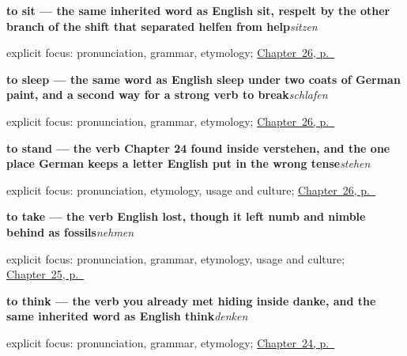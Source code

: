 \noindent\begin{minipage}[t]{\linewidth}
\raggedright
\textbf{to sit — the same inherited word as English sit, respelt by the other branch of the shift that separated helfen from help}\enspace\emph{sitzen}\par
\footnotesize explicit focus: pronunciation, grammar, etymology; \hyperref[ch:ge-still-verbs]{Chapter~26, p.~\pageref*{ch:ge-still-verbs}}
\end{minipage}\par\smallskip

\noindent\begin{minipage}[t]{\linewidth}
\raggedright
\textbf{to sleep — the same word as English sleep under two coats of German paint, and a second way for a strong verb to break}\enspace\emph{schlafen}\par
\footnotesize explicit focus: pronunciation, grammar, etymology; \hyperref[ch:ge-still-verbs]{Chapter~26, p.~\pageref*{ch:ge-still-verbs}}
\end{minipage}\par\smallskip

\noindent\begin{minipage}[t]{\linewidth}
\raggedright
\textbf{to stand — the verb Chapter 24 found inside verstehen, and the one place German keeps a letter English put in the wrong tense}\enspace\emph{stehen}\par
\footnotesize explicit focus: pronunciation, etymology, usage and culture; \hyperref[ch:ge-still-verbs]{Chapter~26, p.~\pageref*{ch:ge-still-verbs}}
\end{minipage}\par\smallskip

\noindent\begin{minipage}[t]{\linewidth}
\raggedright
\textbf{to take — the verb English lost, though it left numb and nimble behind as fossils}\enspace\emph{nehmen}\par
\footnotesize explicit focus: pronunciation, grammar, etymology, usage and culture; \hyperref[ch:ge-doing-verbs]{Chapter~25, p.~\pageref*{ch:ge-doing-verbs}}
\end{minipage}\par\smallskip

\noindent\begin{minipage}[t]{\linewidth}
\raggedright
\textbf{to think — the verb you already met hiding inside danke, and the same inherited word as English think}\enspace\emph{denken}\par
\footnotesize explicit focus: pronunciation, grammar, etymology; \hyperref[ch:ge-mind-verbs]{Chapter~24, p.~\pageref*{ch:ge-mind-verbs}}
\end{minipage}\par\smallskip

